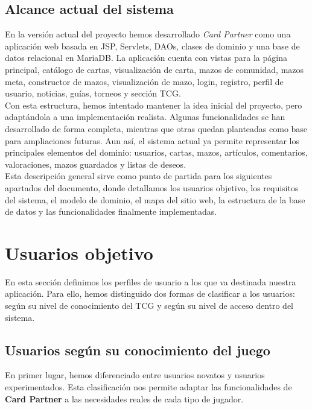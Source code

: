 \documentclass[10pt]{article}
\begin{document}
        
    \subsection{Alcance actual del sistema}        
        En la versión actual del proyecto hemos desarrollado \textit{Card Partner} como una aplicación web basada en JSP, Servlets, DAOs, clases de dominio y una base de datos relacional en MariaDB. La aplicación cuenta con vistas para la página principal, catálogo de cartas, visualización de carta, mazos de comunidad, mazos meta, constructor de mazos, visualización de mazo, login, registro, perfil de usuario, noticias, guías, torneos y sección TCG.\\
        
        Con esta estructura, hemos intentado mantener la idea inicial del proyecto, pero adaptándola a una implementación realista. Algunas funcionalidades se han desarrollado de forma completa, mientras que otras quedan planteadas como base para ampliaciones futuras. Aun así, el sistema actual ya permite representar los principales elementos del dominio: usuarios, cartas, mazos, artículos, comentarios, valoraciones, mazos guardados y listas de deseos.\\
        
        Esta descripción general sirve como punto de partida para los siguientes apartados del documento, donde detallamos los usuarios objetivo, los requisitos del sistema, el modelo de dominio, el mapa del sitio web, la estructura de la base de datos y las funcionalidades finalmente implementadas.

    \newpage   
		
	\section{Usuarios objetivo}       
        En esta sección definimos los perfiles de usuario a los que va destinada nuestra aplicación. Para ello, hemos distinguido dos formas de clasificar a los usuarios: según su nivel de conocimiento del TCG y según su nivel de acceso dentro del sistema.
        
    \subsection{Usuarios según su conocimiento del juego}
        En primer lugar, hemos diferenciado entre usuarios novatos y usuarios experimentados. Esta clasificación nos permite adaptar las funcionalidades de \textbf{Card Partner} a las necesidades reales de cada tipo de jugador.
\end{document}
